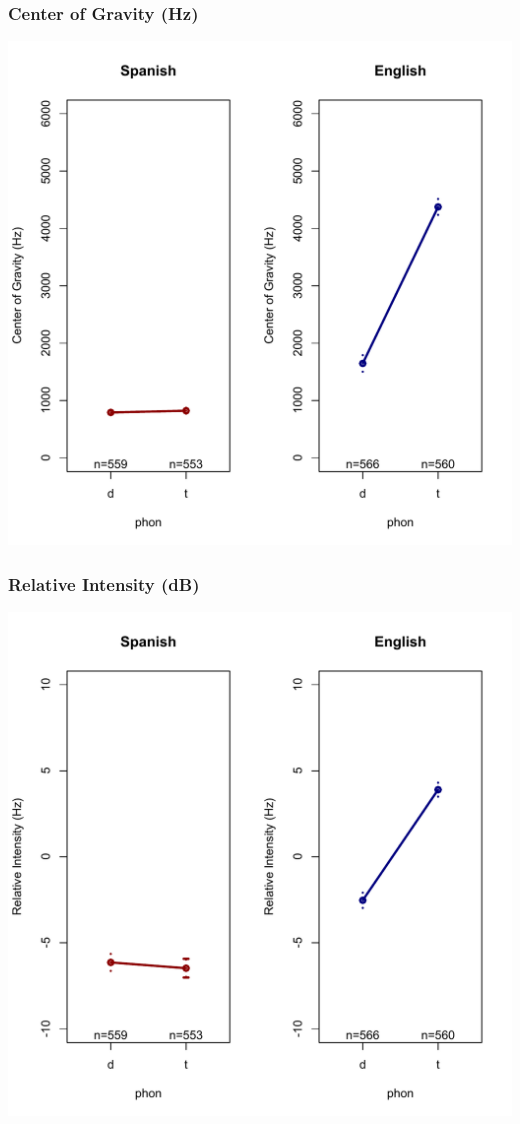 \documentclass{beamer}
\begin{document}
\begin{frame}
\frametitle{Center of Gravity (Hz)}
\begin{center}
\includegraphics[scale=.375]{simplified/fig11_cogbilinguals.pdf}
\end{center}
\end{frame}

\begin{frame}
\frametitle{Relative Intensity (dB)}
\begin{center}
\includegraphics[scale=.375]{simplified/fig12_ribilinguals.pdf}
\end{center}
\end{frame}
\end{document}
